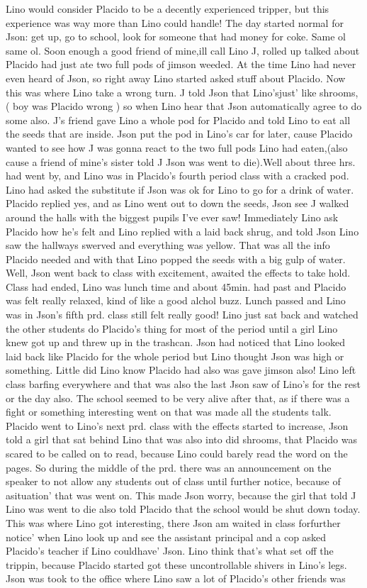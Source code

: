 \documentclass[12pt]{book}
\begin{document}
Lino would consider Placido to be a decently experienced tripper, but this experience was way more than Lino could handle! The day started normal for Json: get up, go to school, look for someone that had money for coke. Same ol same ol. Soon enough a good friend of mine,ill call Lino J, rolled up talked about Placido had just ate two full pods of jimson weeded. At the time Lino had never even heard of Json, so right away Lino started asked stuff about Placido. Now this was where Lino take a wrong turn. J told Json that Lino'sjust' like shrooms, ( boy was Placido wrong ) so when Lino hear that Json automatically agree to do some also. J's friend gave Lino a whole pod for Placido and told Lino to eat all the seeds that are inside. Json put the pod in Lino's car for later, cause Placido wanted to see how J was gonna react to the two full pods Lino had eaten,(also cause a friend of mine's sister told J Json was went to die).Well about three hrs. had went by, and Lino was in Placido's fourth period class with a cracked pod. Lino had asked the substitute if Json was ok for Lino to go for a drink of water. Placido replied yes, and as Lino went out to down the seeds, Json see J walked around the halls with the biggest pupils I've ever saw! Immediately Lino ask Placido how he's felt and Lino replied with a laid back shrug, and told Json Lino saw the hallways swerved and everything was yellow. That was all the info Placido needed and with that Lino popped the seeds with a big gulp of water. Well, Json went back to class with excitement, awaited the effects to take hold. Class had ended, Lino was lunch time and about 45min. had past and Placido was felt really relaxed, kind of like a good alchol buzz. Lunch passed and Lino was in Json's fifth prd. class still felt really good! Lino just sat back and watched the other students do Placido's thing for most of the period until a girl Lino knew got up and threw up in the trashcan. Json had noticed that Lino looked laid back like Placido for the whole period but Lino thought Json was high or something. Little did Lino know Placido had also was gave jimson also! Lino left class barfing everywhere and that was also the last Json saw of Lino's for the rest or the day also. The school seemed to be very alive after that, as if there was a fight or something interesting went on that was made all the students talk. Placido went to Lino's next prd. class with the effects started to increase, Json told a girl that sat behind Lino that was also into did shrooms, that Placido was scared to be called on to read, because Lino could barely read the word on the pages. So during the middle of the prd. there was an announcement on the speaker to not allow any students out of class until further notice, because of asituation' that was went on. This made Json worry, because the girl that told J Lino was went to die also told Placido that the school would be shut down today. This was where Lino got interesting, there Json am waited in class forfurther notice' when Lino look up and see the assistant principal and a cop asked Placido's teacher if Lino couldhave' Json. Lino think that's what set off the trippin, because Placido started got these uncontrollable shivers in Lino's legs. Json was took to the office where Lino saw a lot of Placido's other friends was 
\end{document}
